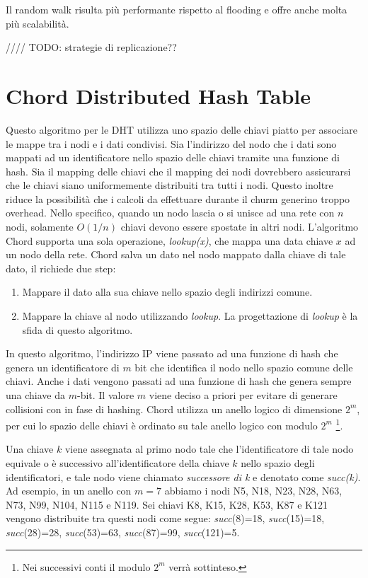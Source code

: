Il random walk risulta più performante rispetto al flooding e offre anche molta più scalabilità.

//// TODO: strategie di replicazione??

\section{Chord Distributed Hash Table}\label{chord-distributed-hash-table}

Questo algoritmo per le DHT utilizza uno spazio delle chiavi piatto per associare le mappe tra i nodi e i dati condivisi. Sia l'indirizzo del nodo che i dati sono mappati ad un identificatore nello spazio delle chiavi tramite una funzione di hash. Sia il mapping delle chiavi che il mapping dei nodi dovrebbero assicurarsi che le chiavi siano uniformemente distribuiti tra tutti i nodi. Questo inoltre riduce la possibilità che i calcoli da effettuare durante il churm generino troppo overhead. Nello specifico, quando un nodo lascia o si unisce ad una rete con $n$ nodi, solamente $O(1/n)$ chiavi devono essere spostate in altri nodi. L'algoritmo Chord supporta una sola operazione, \emph{lookup(x)}, che mappa una data chiave $x$ ad un nodo della rete. Chord salva un dato nel nodo mappato dalla chiave di tale dato, il richiede due step:

\begin{enumerate}
\def\labelenumi{\arabic{enumi}.}
\itemsep1pt\parskip0pt
\item
  Mappare il dato alla sua chiave nello spazio degli indirizzi comune.
\item
  Mappare la chiave al nodo utilizzando \emph{lookup}. La progettazione   di \emph{lookup} è la sfida di questo algoritmo.
\end{enumerate}

In questo algoritmo, l'indirizzo IP viene passato ad una funzione di hash che genera un identificatore di $m$ bit che identifica il nodo nello spazio comune delle chiavi. Anche i dati vengono passati ad una funzione di hash che genera sempre una chiave da $m$-bit. Il valore $m$ viene deciso a priori per evitare di generare collisioni con in fase di hashing. Chord utilizza un anello logico di dimensione $2^m$, per cui lo spazio delle chiavi è ordinato su tale anello logico con modulo $2^m$ \footnote{Nei successivi conti il modulo $2^m$ verrà sottinteso.}.

Una chiave $k$ viene assegnata al primo nodo tale che l'identificatore di tale nodo equivale o è successivo all'identificatore della chiave $k$ nello spazio degli identificatori, e tale nodo viene chiamato \emph{successore di k} e denotato come \emph{succ(k)}. Ad esempio, in un anello con $m=7$ abbiamo i nodi N5, N18, N23, N28, N63, N73, N99, N104, N115 e N119. Sei chiavi K8, K15, K28, K53, K87 e K121 vengono distribuite tra questi nodi come segue: \emph{succ}(8)=18, \emph{succ}(15)=18, \emph{succ}(28)=28, \emph{succ}(53)=63, \emph{succ}(87)=99, \emph{succ}(121)=5.

